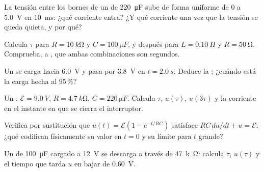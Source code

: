 \begin{exercise}[$\star$]\label{exo:g12:rc-rl-circuits:3}
La tensión entre los bornes de un  de \qty{220}{\micro F} sube de forma
uniforme de $0$ a \qty{5.0}{V} en \qty{10}{ms}: ¿qué corriente entra? ¿Y qué corriente
una vez que la tensión se queda quieta, y por qué?
\end{exercise}

\begin{exercise}[$\star$]\label{exo:g12:rc-rl-circuits:4}
Calcula $\tau$ para $R = \qty{10}{k\ohm}$ y $C = \qty{100}{\micro F}$, y después para
$L = \qty{0.10}{H}$ y $R = \qty{50}{\ohm}$. Comprueba,  a , que ambas
combinaciones son segundos.
\end{exercise}

\begin{exercise}[$\star$]\label{exo:g12:rc-rl-circuits:5}
Un  se carga hacia \qty{6.0}{V} y pasa por \qty{3.8}{V} en
$t = \qty{2.0}{s}$. Deduce la ; ¿cuándo está la carga hecha al
$95\,\%$?
\end{exercise}

\begin{exercise}[$\star\star$]\label{exo:g12:rc-rl-circuits:6}
Un : $\mathcal{E} = \qty{9.0}{V}$, $R = \qty{4.7}{k\ohm}$,
$C = \qty{220}{\micro F}$. Calcula $\tau$, $u(\tau)$, $u(3\tau)$ y la corriente en el
instante en que se cierra el interruptor.
\end{exercise}

\begin{exercise}[$\star\star$]\label{exo:g12:rc-rl-circuits:7}
Verifica por sustitución que $u(t) = \mathcal{E}(1 - e^{-t/RC})$ satisface
$RC\,du/dt + u = \mathcal{E}$; ¿qué codifican físicamente su valor en $t = 0$ y su
límite para $t$ grande?
\end{exercise}

\begin{exercise}[$\star\star$]\label{exo:g12:rc-rl-circuits:8}
Un  de \qty{100}{\micro F} cargado a \qty{12}{V} se descarga a través de
\qty{47}{k\ohm}: calcula $\tau$, $u(\tau)$ y el tiempo que tarda $u$ en bajar de
\qty{0.60}{V}.
\end{exercise}

